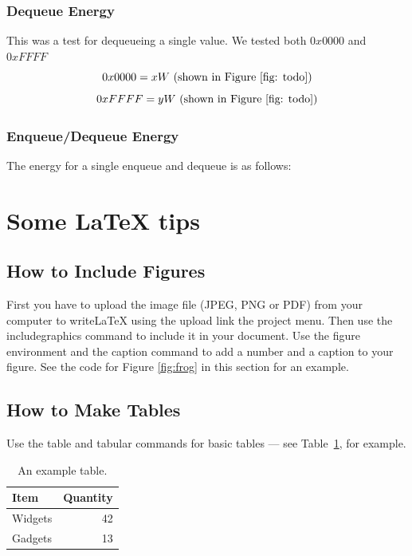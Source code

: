 \documentclass[a4paper]{article}
\begin{document}
\subsubsection{Dequeue Energy}
This was a test for dequeueing a single value. We tested both $0x0000$ and $0xFFFF$
$$0x0000 = xW\textnormal{ (shown in Figure \ref{fig: todo})}$$
$$0xFFFF = yW\textnormal{ (shown in Figure \ref{fig: todo})}$$

\subsubsection{Enqueue/Dequeue Energy}
The energy for a single enqueue and dequeue is as follows:

\newpage
\section{Some LaTeX tips}
\label{sec:latex}
\subsection{How to Include Figures}

First you have to upload the image file (JPEG, PNG or PDF) from your computer to writeLaTeX using the upload link the project menu. Then use the includegraphics command to include it in your document. Use the figure environment and the caption command to add a number and a caption to your figure. See the code for Figure \ref{fig:frog} in this section for an example.


\subsection{How to Make Tables}

Use the table and tabular commands for basic tables --- see Table~\ref{tab:widgets}, for example.

\begin{table}
\centering
\begin{tabular}{l|r}
Item & Quantity \\\hline
Widgets & 42 \\
Gadgets & 13
\end{tabular}
\caption{\label{tab:widgets}An example table.}
\end{table}
\end{document}
